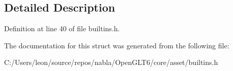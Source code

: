 \subsection{Detailed Description}


Definition at line 40 of file builtins.\+h.



The documentation for this struct was generated from the following file\+:\begin{DoxyCompactItemize}
\item 
C\+:/\+Users/leon/source/repos/nabla/\+Open\+G\+L\+T6/core/asset/builtins.\+h\end{DoxyCompactItemize}
